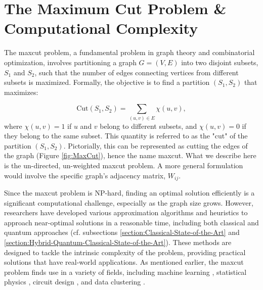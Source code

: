 \section{The Maximum Cut Problem \& Computational Complexity}
\label{section:MaxCut_Comp._Complexity}

The \acrshort{maxcut} problem, a fundamental problem in graph theory and combinatorial optimization, involves partitioning a graph \( G = (V, E) \) into two disjoint subsets, \( S_1 \) and \( S_2 \), such that the number of edges connecting vertices from different subsets is maximized. Formally, the objective is to find a partition \( (S_1, S_2) \) that maximizes:

\begin{equation}\label{eq:Cut}
\text{Cut}(S_1, S_2) = \sum_{(u, v) \in E} \chi(u, v),
\end{equation}
where \( \chi(u, v) = 1 \) if \( u \) and \( v \) belong to different subsets, and \( \chi(u, v) = 0 \) if they belong to the same subset. This quantity is referred to as the "cut" of the partition $(S_1, S_2)$. Pictorially, this can be represented as cutting the edges of the graph (Figure \ref{fig:MaxCut}), hence the name \acrshort{maxcut}. What we describe here is the un-directed, un-weighted \acrshort{maxcut} problem. A more general formulation would involve the specific graph's adjacency matrix, $W_{ij}$.

Since the \acrshort{maxcut} problem is NP-hard, finding an optimal solution efficiently is a significant computational challenge, especially as the graph size grows. However, researchers have developed various approximation algorithms and heuristics to approach near-optimal solutions in a reasonable time, including both classical and quantum approaches (cf. subsections \ref{section:Classical-State-of-the-Art} and \ref{section:Hybrid-Quantum-Classical-State-of-the-Art}). These methods are designed to tackle the intrinsic complexity of the problem, providing practical solutions that have real-world applications. As mentioned earlier, the \acrshort{maxcut} problem finds use in a variety of fields, including machine learning \cite{937505}, statistical physics \cite{Barahona_Grötschel_Jünger_Reinelt_1988}, circuit design \cite{Barahona_Grötschel_Jünger_Reinelt_1988}, and data clustering \cite{10.1007/11893318_21}.

